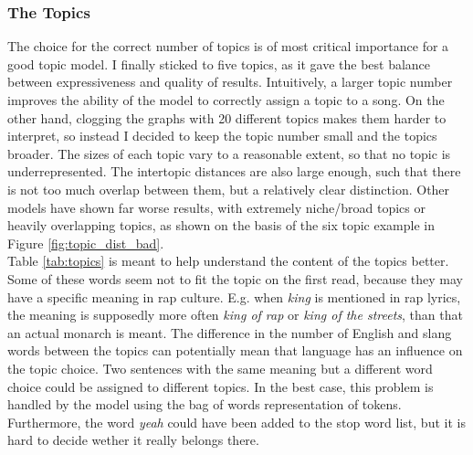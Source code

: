 \documentclass[conference]{IEEEtran}
\begin{document}
\subsubsection{The Topics} \label{discussion_topics}
The choice for the correct number of topics is of most critical importance for a good topic model. I finally sticked to five topics, as it gave the best balance between expressiveness and quality of results. Intuitively, a larger topic number improves the ability of the model to correctly assign a topic to a song. On the other hand, clogging the graphs with 20 different topics makes them harder to interpret, so instead I decided to keep the topic number small and the topics broader. The sizes of each topic vary to a reasonable extent, so that no topic is underrepresented. The intertopic distances are also large enough, such that there is not too much overlap between them, but a relatively clear distinction. Other models have shown far worse results, with extremely niche/broad topics or heavily overlapping topics, as shown on the basis of the six topic example in Figure \ref{fig:topic_dist_bad}.\\
Table \ref{tab:topics} is meant to help understand the content of the topics better. Some of these words seem not to fit the topic on the first read, because they may have a specific meaning in rap culture. E.g. when \textit{king} is mentioned in rap lyrics, the meaning is supposedly more often \textit{king of rap} or \textit{king of the streets}, than that an actual monarch is meant. The difference in the number of English and slang words between the topics can potentially mean that language has an influence on the topic choice. Two sentences with the same meaning but a different word choice could be assigned to different topics. In the best case, this problem is handled by the model using the bag of words representation of tokens. Furthermore, the word \textit{yeah} could have been added to the stop word list, but it is hard to decide wether it really belongs there.
\end{document}
